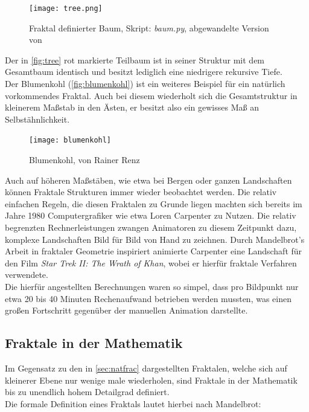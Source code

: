 \documentclass[a4paper,12pt,onesided]{report}
\begin{document}
\begin{figure}[H]
	\centering
	\texttt{[image: tree.png]}
	\caption{Fraktal definierter Baum, Skript: \textit{baum.py}, abgewandelte Version von \cite{soTree}} %
	\label{fig:tree}
\end{figure}

Der in \autoref{fig:tree} rot markierte Teilbaum ist in seiner Struktur mit dem Gesamtbaum identisch und besitzt lediglich eine niedrigere rekursive Tiefe.\\
Der Blumenkohl (\autoref{fig:blumenkohl}) ist ein weiteres Beispiel für ein natürlich vorkommendes Fraktal. 
Auch bei diesem wiederholt sich die Gesamtstruktur in kleinerem Maßstab in den Ästen, er besitzt also ein gewisses Maß an Selbstähnlichkeit.

\begin{figure}[H]
	\centering
	\texttt{[image: blumenkohl]}
	\caption{Blumenkohl, von Rainer Renz}
	\label{fig:blumenkohl}
\end{figure}

Auch auf höheren Maßstäben, wie etwa bei Bergen oder ganzen Landschaften können Fraktale Strukturen immer wieder beobachtet werden. 
Die relativ einfachen Regeln, die diesen Fraktalen zu Grunde liegen machten sich bereits im Jahre 1980 Computergrafiker wie etwa Loren Carpenter zu Nutzen. Die relativ begrenzten Rechnerleistungen zwangen Animatoren zu diesem Zeitpunkt dazu, komplexe Landschaften Bild für Bild von Hand zu zeichnen. Durch Mandelbrot's Arbeit in fraktaler Geometrie inspiriert animierte Carpenter eine Landschaft für den Film \textit{Star Trek II: The Wrath of Khan}, wobei er hierfür fraktale Verfahren verwendete. \cite{startrekFractals}\\
Die hierfür angestellten Berechnungen waren so simpel, dass pro Bildpunkt nur etwa 20 bis 40 Minuten Rechenaufwand betrieben werden mussten, was einen großen Fortschritt gegenüber der manuellen Animation darstellte. \cite{carpenterVolLibre}\\

\subsection{Fraktale in der Mathematik}
Im Gegensatz zu den in \autoref{sec:natfrac} dargestellten Fraktalen, welche sich auf kleinerer Ebene nur wenige male wiederholen, sind Fraktale in der Mathematik bis zu unendlich hohem Detailgrad definiert.\\
Die formale Definition eines Fraktals lautet hierbei nach Mandelbrot:
\end{document}
